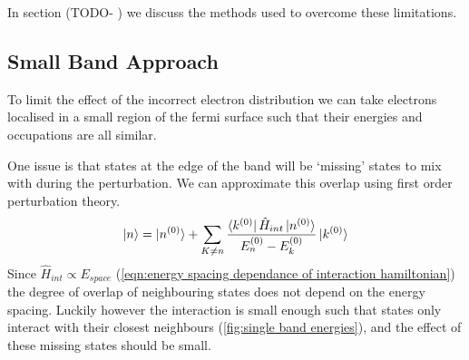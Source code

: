 In section (TODO- ) we discuss the methods
used to overcome these limitations.

\subsection{Small Band Approach}\label{sec:small band approach}
To limit the effect of the incorrect
electron distribution we can
take electrons localised
in a small region of the fermi
surface such that their energies
and occupations are all similar.

One issue is that states at the edge
of the band will be `missing'
states to mix with during the
perturbation. We can approximate
this overlap using first order perturbation theory.
\begin{equation}
    \ket{n} = \ket{n^{(0)}} + \sum_{K\neq{}n} \frac{\bra{k^{(0)}} \hat{H}_{int} \ket{n^{(0)}}}{E_n^{(0)} - E_k^{(0)}} \ket{k^{(0)}}
\end{equation}
Since \(\hat{H}_{int} \propto E_{space}\)
(\cref{eqn:energy spacing dependance of interaction hamiltonian})
the degree of overlap of neighbouring states does
not depend on the energy spacing. Luckily
however the interaction is small
enough such that states only interact with
their closest neighbours (\cref{fig:single band energies}),
and the effect of these missing states should be small.
